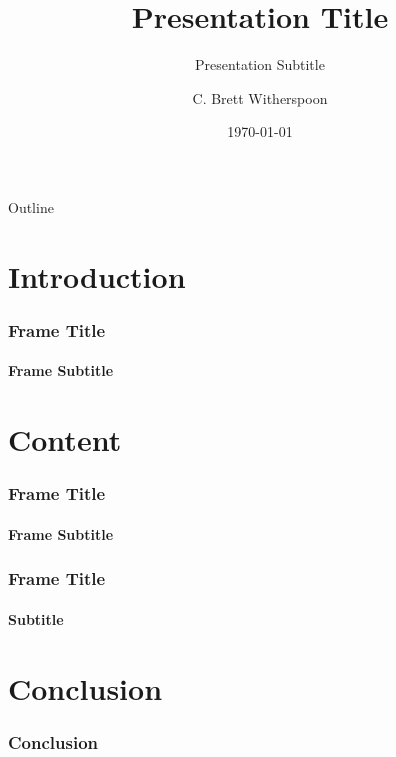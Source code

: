 \documentclass{beamer}
\title{\textcolor{ttugold}{Presentation Title}}
\subtitle{Presentation Subtitle}
\author[Brett Witherspoon]{C. Brett Witherspoon}
\date{\today}
\institute[\textcolor{ttugold}{Tennessee Technological University}]{\texttt{[image: wordmark.png]}}
\begin{document}
{
\begin{frame}
  \titlepage
\end{frame}
}

\begin{frame}{\textcolor{ttugold}{Outline}}
    \tableofcontents[pausesections]
\end{frame}

\section{Introduction}

\begin{frame}
    \frametitle{\textcolor{ttugold}{Frame Title}}
    \framesubtitle{Frame Subtitle}

\end{frame}

\section{Content}

\begin{frame}
    \frametitle{\textcolor{ttugold}{Frame Title}}
    \framesubtitle{Frame Subtitle}

\end{frame}

\begin{frame}
    \frametitle{\textcolor{ttugold}{Frame Title}}
    \framesubtitle{Subtitle}

\end{frame}

\section{Conclusion}

\begin{frame}
    \frametitle{\textcolor{ttugold}{Conclusion}}

\end{frame}
\end{document}
